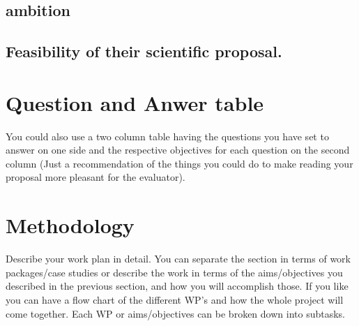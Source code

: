 \documentclass[oneside, a4paper, onecolumn, 11pt]{article}
\begin{document}
\subsection{ ambition}

\subsection{Feasibility of their scientific proposal.}


\section{Question and Anwer table}
You could also use a two column table having the questions you have set to answer on one side and the respective objectives for each question on the second column (Just a recommendation of the things you could do to make reading your proposal more pleasant for the evaluator).



\newpage
\section{Methodology}

\smallskip
\smallskip
\noindent
Describe your work plan in detail. You can separate the section in terms of work packages/case studies or describe the work in terms of the aims/objectives you described in the previous section, and how you will accomplish those. If you like you can have a flow chart of the different WP’s and how the whole project will come together. Each WP or aims/objectives can be broken down into subtasks.
\end{document}
